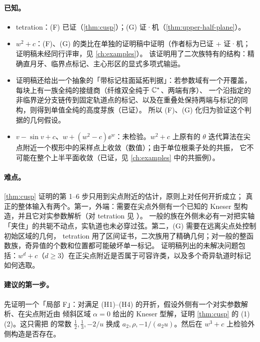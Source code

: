 \paragraph{已知。}
\begin{itemize}
\item tetration：(F) 已证（\cref{thm:cusp}）；(G) 证·机（\cref{thm:upper-half-plane}）。
\item $w^2+c$：(F)、(G) 的类比在单独的证明稿中证明（作者标为已证 + 证·机；证明稿未经同行评审，见 \cref{ch:examples}）。
  该证明用了二次族特有的结构：精确直月牙、临界点标记、主心形区的显式多项式输运。
\item 证明稿还给出一个抽象的「带标记柱面延拓判据」：若参数域有一个开覆盖，每块上有一族全纯的接缝商（纤维双全纯于 $\mathbb{C}^*$、两端有序）、
  一个沿指定的非临界逆分支链传到固定轨道点的标记、以及在重叠处保持两端与标记的同构，则得到单值全纯的高度芽族（已证）。
  所以 (F)、(G) 化归为验证这个判据的几何假设。
\item $v-\sin v+c$、$w+(w^2-c)\ee^w$：未检验。$w^2+c$ 上原有的 $\theta$ 迭代算法在尖点附近一个楔形中的采样点上收敛（数值）；由于单位根乘子处的共振，
  它不可能在整个上半平面收敛（已证，见 \cref{ch:examples} 中的共振例）。
\end{itemize}

\paragraph{难点。}\cref{thm:cusp} 证明的第 1--6 步只用到尖点附近的估计，原则上对任何开折成立；
真正的整体输入有两个。第一，外端：需要在尖点外侧有一个已知的 Kneser 型构造，并且它对实参数解析（对 tetration 见 \cite[命题~10.11]{KneserPaper}）。
一般的族在外侧未必有一对把实轴「夹住」的共轭不动点，实轨道也未必穿过弦。第二，(G) 需要在远离尖点处控制初始区域的几何，
tetration 用了区间证书，二次族用了精确几何；对一般的整函数族，奇异值的个数和位置都可能破坏单一标记。
证明稿列出的未解决问题包括：$w^d+c$（$d\ge3$）在正尖点附近是否属于可容许类，以及多个奇异轨道时标记如何选取。

\paragraph{建议的第一步。}先证明一个「局部 F」：对满足 (H1)--(H4) 的开折，假设外侧有一个对实参数解析、在尖点附近由
倾斜区域 $\alpha=0$ 给出的 Kneser 型解，证明 \cref{thm:cusp} 的 (1)(2)。这只需把 \cite[第~10.1--10.8~节]{KneserPaper} 的常数
$\tfrac12,\tfrac13,-2/u$ 换成 $a_2,\rho,-1/(a_2u)$。然后在 $w^3+c$ 上检验外侧构造是否存在。

